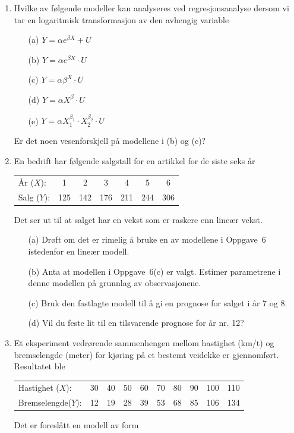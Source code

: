 \begin{enumerate}
\item Hvilke av følgende modeller kan analyseres ved regresjonsanalyse
dersom vi tar en logaritmisk transformasjon av den avhengig variable

\begin{itemize}
\item[(a)] $Y=\alpha e^{\beta X}+U$
\item[(b)] $Y=\alpha e^{\beta X}\cdot U$
\item[(c)] $Y=\alpha {\beta}^X\cdot U$
\item[(d)] $Y=\alpha X^{\beta}\cdot U$
\item[(e)] $Y=\alpha X_1^{{\beta}_1}\cdot X_2^{{\beta}_2}\cdot U$
\end{itemize}

Er det noen vesenforskjell på modellene i (b) og (c)?

\item
En bedrift har følgende salgstall for en artikkel for de siste seks år
\begin{center}
\begin{tabular}{lcccccc}
År ($X$):  &     1   &   2   &   3   &   4   &   5   &   6 \\
Salg ($Y$):    &    125  &  142  &  176  &  211  &  244  &  306
\end{tabular}
\end{center}
Det ser ut til at salget har en vekst som er raskere enn lineær vekst.

\begin{itemize}
\item [(a)] Drøft om det er rimelig å bruke en av modellene i Oppgave~6
   istedenfor en lineær modell.
\item[(b)] Anta at modellen i Oppgave~6(c) er valgt.  Estimer parametrene
  i denne modellen på grunnlag av observasjonene.
\item[(c)] Bruk den fastlagte modell til å gi en prognose for salget i 
   år 7 og 8.
\item[(d)] Vil du feste lit til en tilsvarende prognose for år nr. 12?
\end{itemize}

\item
Et eksperiment vedrørende sammenhengen mellom hastighet (km/t) og
bremselengde (meter) for kjøring på et bestemt veidekke er 
gjennomført.  Resultatet ble
\begin{center}
\begin{tabular}{lccccccccc}
Hastighet ($X$): & 30 &  40  &  50  &  60  &  70  &  80  &  90  &  100  & 110\\
Bremselengde($Y$):&12 &  19  &  28  &  39  &  53  &  68  &  85  &  106  & 134
\end{tabular}
\end{center}
Det er foreslått en modell av form


\end{enumerate}
